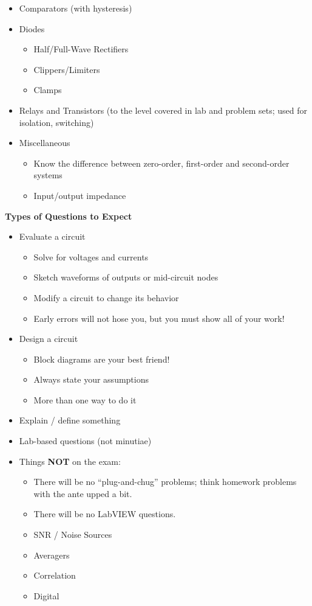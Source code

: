 \documentclass[10pt]{report}
\begin{document}
\begin{itemize}
\item Comparators (with hysteresis)

\item Diodes
\begin{itemize}
    \item Half/Full-Wave Rectifiers
    \item Clippers/Limiters
    \item Clamps
\end{itemize}

\item Relays and Transistors (to the level covered in lab and problem sets; used for isolation, switching) 

\item Miscellaneous
\begin{itemize}
    \item Know the difference between zero-order, first-order and second-order systems
    \item Input/output impedance
\end{itemize}

\end{itemize}

{\bf Types of Questions to Expect}
\begin{itemize}
    \item Evaluate a circuit
    \begin{itemize}
        \item Solve for voltages and currents
        \item Sketch waveforms of outputs or mid-circuit nodes
        \item Modify a circuit to change its behavior
        \item Early errors will not hose you, but you must show all of your work!
    \end{itemize}
    \item Design a circuit
    \begin{itemize}
        \item Block diagrams are your best friend!
        \item Always state your assumptions
        \item More than one way to do it
    \end{itemize}
    \item Explain / define something
    \item Lab-based questions (not minutiae)
    \item Things {\bf NOT} on the exam:
    \begin{itemize}
        \item There will be no ``plug-and-chug'' problems; think homework problems with the ante upped a bit.
        \item There will be no LabVIEW questions.
        \item SNR / Noise Sources
        \item Averagers
        \item Correlation
        \item Digital
    \end{itemize}
\end{itemize}
\end{document}

